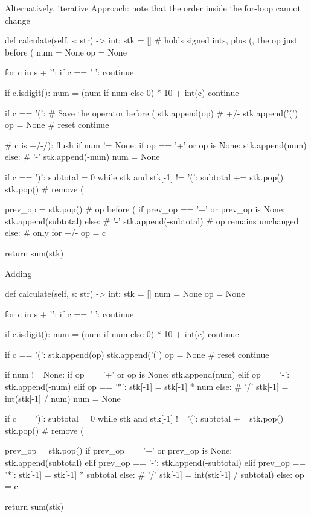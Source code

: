 Alternatively, iterative Approach: note that the order inside the for-loop cannot change
\begin{python}
def calculate(self, s: str) -> int:
    stk = []  # holds signed ints, plus (, the op just before (
    num = None
    op = None

    for c in s + '\0':
        if c == ' ':
            continue

        if c.isdigit():
            num = (num if num else 0) * 10 + int(c)
            continue

        if c == '(':
            # Save the operator before ( 
            stk.append(op)  # +/-
            stk.append('(')
            op = None # reset 
            continue
		
        # c is +/-/): flush
        if num != None:
            if op == '+' or op is None:
                stk.append(num)
            else:  # '-'
                stk.append(-num)
            num = None

        if c == ')':
            subtotal = 0
            while stk and stk[-1] != '(':
                subtotal += stk.pop()
            stk.pop()  # remove (
            
            prev_op = stk.pop()  # op before (
            if prev_op == '+' or prev_op is None:
                stk.append(subtotal)
            else:  # '-'
                stk.append(-subtotal)
            # op remains unchanged
        else:  # only for +/-            
            op = c

    return sum(stk)
\end{python}
Adding 
\begin{python}
def calculate(self, s: str) -> int:
    stk = []
    num = None
    op = None

    for c in s + '\0':
        if c == ' ':
            continue

        if c.isdigit():
            num = (num if num else 0) * 10 + int(c)
            continue

        if c == '(':
            stk.append(op)
            stk.append('(')
            op = None  # reset
            continue

        if num != None:
            if op == '+' or op is None:
                stk.append(num)
            elif op == '-':
                stk.append(-num)
            elif op == '*':
                stk[-1] = stk[-1] * num
            else:  # '/'
                stk[-1] = int(stk[-1] / num)
            num = None

        if c == ')':
            subtotal = 0
            while stk and stk[-1] != '(':
                subtotal += stk.pop()
            stk.pop()  # remove (
            
            prev_op = stk.pop()
            if prev_op == '+' or prev_op is None:
                stk.append(subtotal)
            elif prev_op == '-':
                stk.append(-subtotal)
            elif prev_op == '*':
                stk[-1] = stk[-1] * subtotal
            else:  # '/'
                stk[-1] = int(stk[-1] / subtotal)
        else:
            op = c

    return sum(stk)
\end{python}
